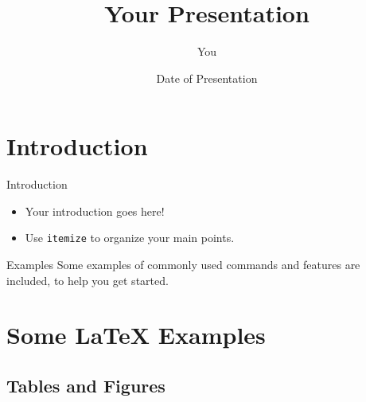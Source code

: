 \documentclass{beamer}
\title[Your Short Title]{Your Presentation}
\author{You}
\institute{Where You're From}
\date{Date of Presentation}
\begin{document}
\begin{frame}
  \titlepage
\end{frame}


\section{Introduction}

\begin{frame}{Introduction}

\begin{itemize}
  \item Your introduction goes here!
  \item Use \texttt{itemize} to organize your main points.
\end{itemize}

\vskip 1cm

\begin{block}{Examples}
Some examples of commonly used commands and features are included, to help you get started.
\end{block}

\end{frame}

\section{Some \LaTeX{} Examples}

\subsection{Tables and Figures}
\end{document}
